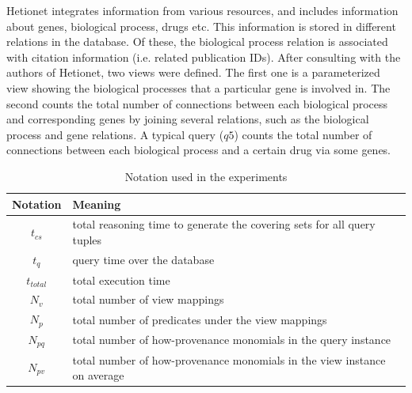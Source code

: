 Hetionet integrates information from various resources, and includes information about genes, biological process, drugs etc.  This information is stored in different relations in the database. Of these, the biological process relation is associated with citation information (i.e. related publication IDs). After consulting with the authors of Hetionet, two views were defined. The first one is a parameterized view showing the  biological processes that a particular gene is involved in. The second counts the total number of connections between each biological process and corresponding genes by joining several relations, such as the biological process and gene relations.  A typical query ($q5$) counts the total number of connections between each biological process and a certain drug via some genes.


\begin{table}
\centering
\caption{Notation used in the experiments}
\small
\begin{tabular}[!h]{|c|>{\centering\arraybackslash}p{6.8cm}|} \hline
Notation & Meaning \\ \hline
$t_{cs}$&total reasoning time to generate the covering sets for all query tuples \\ \hline
$t_{q}$&query time over the database \\ \hline
$t_{total}$&total execution time \\ \hline
$N_v$&total number of view mappings \\ \hline
$N_p$&total number of predicates under the view mappings \\ \hline
$N_{pq}$&total number of how-provenance monomials in the query instance \\ \hline
$N_{pv}$&total number of how-provenance monomials in the view instance on average\\ \hline
\end{tabular}
\label{Table: notation_summary}
\end{table}

